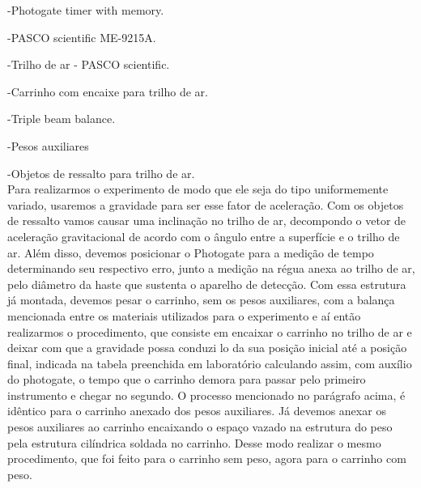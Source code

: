 
-Photogate timer with memory.

-PASCO scientific ME-9215A.

-Trilho de ar - PASCO scientific.

-Carrinho com encaixe para trilho de ar.

-Triple beam balance. 

-Pesos auxiliares

-Objetos de ressalto para trilho de ar.\\

Para realizarmos o experimento de modo que ele seja do tipo uniformemente variado, usaremos a gravidade para ser esse fator de aceleração. Com os objetos de ressalto vamos causar uma inclinação no trilho de ar, decompondo o vetor de aceleração gravitacional de acordo com o ângulo entre a superfície e o trilho de ar. 
Além disso, devemos posicionar o Photogate para a medição de tempo determinando seu respectivo erro, junto a medição na régua anexa ao trilho de ar, pelo diâmetro da haste que sustenta o aparelho de detecção. 
Com essa estrutura já montada, devemos pesar o carrinho, sem os pesos auxiliares, com a balança mencionada entre os materiais utilizados para o experimento e aí então realizarmos o procedimento, que consiste em encaixar o carrinho no trilho de ar e deixar com que a gravidade possa conduzi lo da sua posição inicial até a posição final, indicada na tabela preenchida em laboratório calculando assim, com auxílio do photogate, o tempo que o carrinho demora para passar pelo primeiro instrumento e chegar no segundo.
O processo mencionado no parágrafo acima, é idêntico para o carrinho anexado dos pesos auxiliares. Já devemos anexar os pesos auxiliares ao carrinho encaixando o espaço vazado na estrutura do peso pela estrutura cilíndrica soldada no carrinho. Desse modo realizar o mesmo procedimento, que foi feito para o carrinho sem peso, agora para o carrinho com peso.

